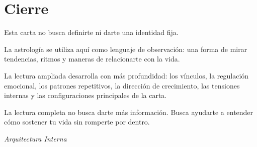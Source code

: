 \documentclass[11pt,a4paper]{article}
\begin{document}
\vspace{0.8cm}


\section{Cierre}

Esta carta no busca definirte ni darte una identidad fija.

La astrología se utiliza aquí como lenguaje de observación:
una forma de mirar tendencias, ritmos y maneras de relacionarte con la vida.

La lectura ampliada desarrolla con más profundidad:
los vínculos,
la regulación emocional,
los patrones repetitivos,
la dirección de crecimiento,
las tensiones internas
y las configuraciones principales de la carta.

La lectura completa no busca darte más información.
Busca ayudarte a entender cómo sostener tu vida sin romperte por dentro.

\vspace{1cm}

\begin{center}

{\small\itshape\color{grisai}
Arquitectura Interna
}

\end{center}
\end{document}
